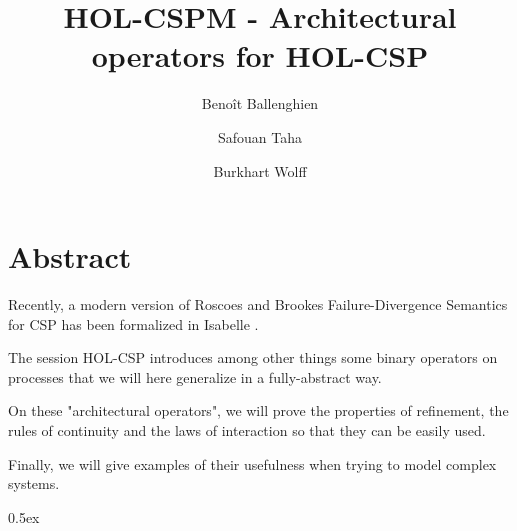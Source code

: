 \documentclass[11pt,a4paper]{book}
\begin{document}
\title{HOL-CSPM - Architectural operators for HOL-CSP}
\author{Benoît Ballenghien \and Safouan Taha \and Burkhart Wolff}
\maketitle
\chapter*{Abstract}

   Recently, a modern version of Roscoes and Brookes \cite{brookes-roscoe85} 
   Failure-Divergence Semantics for CSP has been formalized in Isabelle \cite{HOL-CSP-AFP}. 

   The session HOL-CSP introduces among other things some binary operators on processes
   that we will here generalize in a fully-abstract way.

   On these "architectural operators", we will prove the properties of refinement,
   the rules of continuity and the laws of interaction so that they can be easily used.

   Finally, we will give examples of their usefulness when trying to model complex systems.


\tableofcontents

\parindent 0pt\parskip 0.5ex





\end{document}
